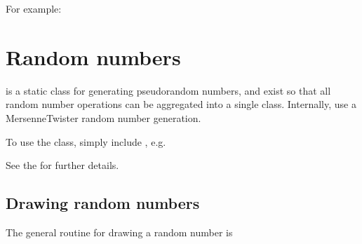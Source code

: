 \documentclass[letterpaper,10pt,english]{sphinxmanual}
\begin{document}
\sphinxAtStartPar
For example:

\begin{sphinxVerbatim}[commandchars=\\\{\},formatcom=\scriptsize]
 


\end{sphinxVerbatim}

\sphinxstepscope


\section{Random numbers}
\label{\detokenize{Utilities/RandomNumbers:random-numbers}}\label{\detokenize{Utilities/RandomNumbers:chap-random}}\label{\detokenize{Utilities/RandomNumbers::doc}}
\sphinxAtStartPar
{} is a static class for generating pseudo\sphinxhyphen{}random numbers, and exist so that all random number operations can be aggregated into a single class.
Internally,  use a Mersenne\sphinxhyphen{}Twister random number generation.

\sphinxAtStartPar
To use the  class, simply include , e.g.

\begin{sphinxVerbatim}[commandchars=\\\{\},formatcom=\scriptsize]
 
\end{sphinxVerbatim}

\sphinxAtStartPar
See the  for further details.


\subsection{Drawing random numbers}
\label{\detokenize{Utilities/RandomNumbers:drawing-random-numbers}}
\sphinxAtStartPar
The general routine for drawing a random number is
\end{document}
